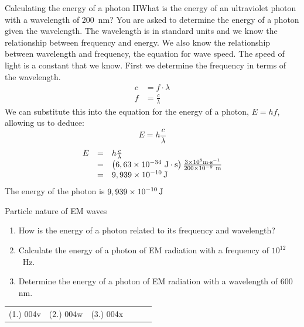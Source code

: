   \begin{wex}{Calculating the energy of a photon II}{What is the energy of an ultraviolet photon with a wavelength of 200~nm?}{
You are asked to determine the energy of a photon given the wavelength. The wavelength is in standard units and we know the relationship between frequency and energy. We also know the relationship between wavelength and frequency, the equation for wave speed. The speed of light is a constant that we know.
First we determine the frequency in terms of the wavelength.
\begin{align*}
 c&=f\cdot\lambda\\
 f&=\frac{c}{\lambda}
\end{align*}
We can substitute this into the equation for the energy of a photon, $E=hf$, allowing us to deduce:
    \begin{equation*}
    E=h\frac{c}{\lambda }
      \end{equation*}
      \label{m38778*id189220}\nopagebreak\noindent{}
    \begin{equation*}
    \begin{array}{ccc}\hfill E& =& h\frac{c}{\lambda }\hfill \\ & =& \left(6,63\ensuremath{\times}{10}^{-34}~\text{J}\cdot\text{s}\right)\frac{3\ensuremath{\times}{10}^{8}\text{m}\cdot\text{s}^{-1}}{200\ensuremath{\times}{10}^{-9}~\text{m}}\hfill \\ & =& 9,939\ensuremath{\times}{10}^{-10}\phantom{\rule{0.166667em}{0ex}}\text{J}\hfill \end{array}
      \end{equation*}
The energy of the photon is $9,939\ensuremath{\times}{10}^{-10}\phantom{\rule{0.166667em}{0ex}}\text{J}$}
         \end{wex}
      \label{m38778*uid13}
            \begin{exercises}{Particle nature of EM waves}\noindent\vspace{-1cm}
        \label{m38778*id189384}\begin{enumerate}[noitemsep, label=\textbf{\arabic*}. ] 
            \label{m38778*uid14}\item How is the energy of a photon related to its frequency and wavelength?\newline
\label{m38778*uid15}\item Calculate the energy of a photon of EM radiation with a frequency of ${10}^{12}$~Hz.\newline
\label{m38778*uid16}\item Determine the energy of a photon of EM radiation with a wavelength of 600 nm.\newline
\end{enumerate}
  \label{m38778**end}
\par \practiceinfo
 \par \begin{tabular}[h]{cccccc}
 (1.) 004v  &  (2.) 004w  &  (3.) 004x  & \end{tabular}
\end{exercises}
            
